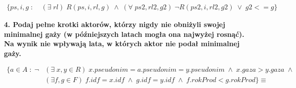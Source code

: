 \documentclass{article}
\begin{document}
\begin{solution}
  \begin{align*}
    \{ps, i, g\;:\;&(\exists\;rl)\;R(ps,i,rl, g)\;\land\;(\forall \;ps2, rl2, g2)\; \neg R(ps2, i, rl2, g2)\;\lor \; g2<=g \}
  \end{align*}

  \textbf{\color{green}4. Podaj pełne krotki aktorów, którzy nigdy nie obniżyli swojej minimalnej gaży (w późniejszych latach mogła ona najwyżej rosnąć). Na wynik nie wpływają lata, w których aktor nie podał minimalnej gaży.}

  \begin{align*} 
    \{a\in A\;:\; \neg&(\exists\;x, y\in R)\;x.pseudonim=a.pseudonim=y.pseudonim\;\land\; x.gaza > y.gaza \;\land \; \\ 
                      &(\exists f, g\in F)\; f.idf=x.idf\;\land\;g.idf=y.idf\;\land\;f.rokProd < g.rokProd\}\equiv \\ 
  \end{align*}
\end{solution}
\end{document}
